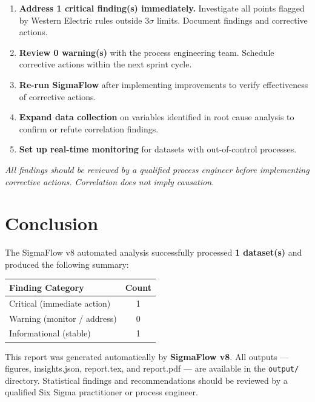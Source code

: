 \documentclass[12pt,a4paper]{article}
\begin{document}
\begin{enumerate}[leftmargin=2em]
  \item \textcolor{sigmaRed}{\textbf{Address 1 critical finding(s) immediately.}}
        Investigate all points flagged by Western Electric rules outside $3\sigma$ limits.
        Document findings and corrective actions.
  \item \textcolor{sigmaOrange}{\textbf{Review 0 warning(s)}} with the
        process engineering team. Schedule corrective actions within the next sprint cycle.
  \item \textbf{Re-run SigmaFlow} after implementing improvements to verify effectiveness
        of corrective actions.
  \item \textbf{Expand data collection} on variables identified in root cause analysis
        to confirm or refute correlation findings.
  \item \textbf{Set up real-time monitoring} for datasets with out-of-control processes.
\end{enumerate}



\medskip\noindent
\textit{All findings should be reviewed by a qualified process engineer before
implementing corrective actions. Correlation does not imply causation.}

\newpage

\section{Conclusion}


The SigmaFlow v8 automated analysis successfully processed
\textbf{1 dataset(s)} and produced the following summary:

\begin{center}
\begin{tabular}{lc}
\toprule
\textbf{Finding Category} & \textbf{Count} \\
\midrule
\textcolor{sigmaRed}{Critical} (immediate action) & 1 \\
\textcolor{sigmaOrange}{Warning} (monitor / address) & 0 \\
\textcolor{sigmaGreen}{Informational} (stable) & 1 \\
\bottomrule
\end{tabular}
\end{center}

\medskip

This report was generated automatically by \textbf{SigmaFlow v8}.
All outputs — figures, insights.json, report.tex, and report.pdf —
are available in the \texttt{output/} directory.
Statistical findings and recommendations should be reviewed by a
qualified Six Sigma practitioner or process engineer.
\end{document}
